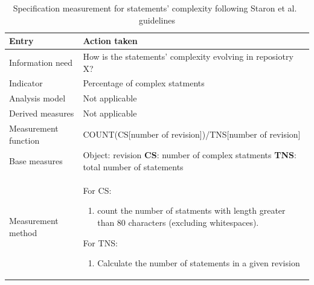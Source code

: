     \begin{table}[!htb]
		\centering
		\tabulinesep=1.2mm
		\begin{tabu} to \textwidth {|X|X[2]|}

			\hline
			\textbf{Entry} & \textbf{Action taken} \\
			\hline

			Information need & How is the statements' complexity evolving in reposiotry X? \\
			\hline

			Indicator & Percentage of complex statments \\
			\hline

			Analysis model & Not applicable \\
			\hline

			Derived measures & Not applicable \\
			\hline

			Measurement function & COUNT(CS[number of revision])/TNS[number of revision] \\
			\hline

			Base measures & Object: revision \newline
			                    \textbf{CS}: number of complex statments \newline
			                    \textbf{TNS}: total number of statements \\
		    \hline

			Measurement method & For CS:
			    \begin{enumerate}
			    \item count the number of statments with length greater than 80 characters (excluding whitespaces).
			    \end{enumerate}

			For TNS:
			\begin{enumerate}
			\item Calculate the number of statements in a given revision
			\end{enumerate}

			\\
			\hline


		\end{tabu}
		\caption[Specification measurement for statements' complexity]
        {Specification measurement for statements' complexity following Staron et al.\ \cite{metrics_paper} guidelines}
        \label{tab:statements_measurement_system}
    \end{table}

